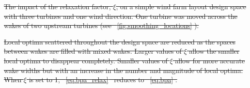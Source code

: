 \documentclass[a4paper]{jpconf}
\providecommand{\DIFdel}[1]{{\protect\color{red}\sout{#1}}}                      %
\providecommand{\DIFdelFL}[1]{\DIFdel{#1}} %
\begin{document}
\DIFdelFL{\hspace{1pc}%
	}%
{%
\DIFdelFL{The impact of the relaxation factor, $\xi$, on a simple wind farm layout design space with three turbines and one wind direction. One turbine was moved across the wakes of two upstream turbines (see \mbox{%
\cref{fig:smoothing_locations}}\hspace{0pt}%
). }}

\DIFdel{Local optima scattered throughout the design space are reduced as the spaces between wakes are filled with mixed wakes. Larger values of $\xi$ allow the smaller local optima to disappear completely. Smaller values of $\xi$ allow for more accurate wake widths but with an increase in the number and magnitude of local optima. When $\xi$ is set to 1, \mbox{%
\cref{eq:bpa_relax} }\hspace{0pt}%
reduces to \mbox{%
\cref{eq:bpa}}\hspace{0pt}%
.
}%

\end{document}
